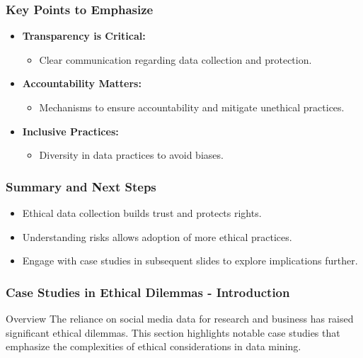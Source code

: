 \documentclass{beamer}
\begin{document}
\begin{frame}[fragile]
    \frametitle{Key Points to Emphasize}
    \begin{itemize}
        \item \textbf{Transparency is Critical:} 
            \begin{itemize}
                \item Clear communication regarding data collection and protection.
            \end{itemize}
        \item \textbf{Accountability Matters:}
            \begin{itemize}
                \item Mechanisms to ensure accountability and mitigate unethical practices.
            \end{itemize}
        \item \textbf{Inclusive Practices:}
            \begin{itemize}
                \item Diversity in data practices to avoid biases.
            \end{itemize}
    \end{itemize}
\end{frame}

\begin{frame}[fragile]
    \frametitle{Summary and Next Steps}
    \begin{itemize}
        \item Ethical data collection builds trust and protects rights.
        \item Understanding risks allows adoption of more ethical practices.
        \item Engage with case studies in subsequent slides to explore implications further.
    \end{itemize}
\end{frame}

\begin{frame}[fragile]
    \frametitle{Case Studies in Ethical Dilemmas - Introduction}
    \begin{block}{Overview}
        The reliance on social media data for research and business has raised significant ethical dilemmas. This section highlights notable case studies that emphasize the complexities of ethical considerations in data mining.
    \end{block}
\end{frame}
\end{document}
